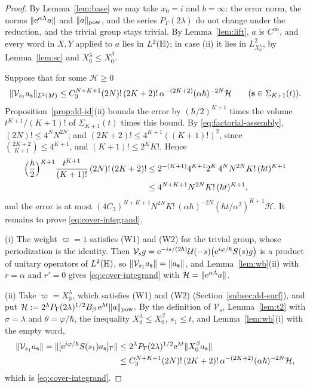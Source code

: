\begin{proof}
By Lemma~\ref{lem:base} we may take $x_0=i$ and $b=\infty$: the error norm, the norms $\lVert \mathrm{e}^{\alpha\Lambda}a\rVert$ and $\lVert a\rVert_{\mathrm{pow}}$, and
the series $P_\Gamma(2\lambda)$ do not change under the reduction, and the trivial group stays trivial. By Lemma~\ref{lem:lift}, $a$ is
$C^\infty$, and every word in $X,Y$ applied to $a$ lies in $L^2(\mathbb{H})$; in case (ii) it lies in $L^2_{X_0^\lambda}$, by
Lemma~\ref{lem:sc} and $X_0^\lambda\le X_0^\beta$.

Suppose that for some $\mathcal H\ge0$
\begin{equation}\label{eq:cover-integrand}
\lVert \mathcal V_{s_1}a_{\mathbf s}\rVert_{L^2(M)}\le C_3^{N+K+1}(2N)!\,(2K+2)!\,\alpha^{-(2K+2)}(\alpha\hbar)^{-2N}\mathcal H\qquad(\mathbf s\in\Sigma_{K+1}(t)).
\end{equation}
Proposition~\ref{prop:dd-id}(ii) bounds the error by $(\hbar/2)^{K+1}$ times the volume $t^{K+1}/(K+1)!$ of $\Sigma_{K+1}(t)$ times this
bound. By \eqref{eq:factorial-assembly}, $(2N)!\le4^NN^{2N}$; and $(2K+2)!\le4^{K+1}((K+1)!)^2$, since $\binom{2K+2}{K+1}\le4^{K+1}$, and
$(K+1)!\le2^KK!$. Hence
\begin{align*}
\Bigl(\frac\hbar2\Bigr)^{K+1}\frac{t^{K+1}}{(K+1)!}\,(2N)!\,(2K+2)!&\le2^{-(K+1)}4^{K+1}2^K\,4^NN^{2N}K!\,(\hbar t)^{K+1}\\
&\le4^{N+K+1}N^{2N}K!\,(\hbar t)^{K+1},
\end{align*}
and the error is at most $(4C_3)^{N+K+1}N^{2N}K!\,(\alpha\hbar)^{-2N}(\hbar t/\alpha^2)^{K+1}\mathcal H$. It remains to prove
\eqref{eq:cover-integrand}.

(i) The weight $\varpi=1$ satisfies \textup{(W1)} and \textup{(W2)} for the trivial group, whose periodization is the identity. Then
$\mathcal V_sg=\mathrm{e}^{-is/(2\hbar)}\mathcal{U}(-s)\bigl(\mathrm{e}^{i\varphi/\hbar}S(s)g\bigr)$ is a product of unitary operators of $L^2(\mathbb{H})$, so
$\lVert \mathcal V_{s_1}a_{\mathbf s}\rVert=\lVert a_{\mathbf s}\rVert$, and Lemma~\ref{lem:wb}(ii) with $r=\alpha$ and $r'=0$ gives
\eqref{eq:cover-integrand} with $\mathcal H=\lVert \mathrm{e}^{\alpha\Lambda}a\rVert$.

(ii) Take $\varpi=X_0^\lambda$, which satisfies \textup{(W1)} and \textup{(W2)} (Section~\ref{subsec:dd-surf}), and put
$\mathcal H:=2^\lambda P_\Gamma(2\lambda)^{1/2}B_\beta\,\mathrm{e}^{\lambda t}\lVert a\rVert_{\mathrm{pow}}$. By the definition of $\mathcal V_s$, Lemma~\ref{lem:t2}
with $\sigma=\lambda$ and $\theta=\varphi/\hbar$, the inequality $X_0^\lambda\le X_0^\beta$, $s_1\le t$, and Lemma~\ref{lem:wb}(i) with the
empty word,
\begin{align*}
\lVert \mathcal V_{s_1}a_{\mathbf s}\rVert=\lVert [\mathrm{e}^{i\varphi/\hbar}S(s_1)a_{\mathbf s}]_\Gamma\rVert
&\le2^\lambda P_\Gamma(2\lambda)^{1/2}\mathrm{e}^{\lambda t}\lVert X_0^\beta a_{\mathbf s}\rVert\\
&\le C_3^{N+K+1}(2N)!\,(2K+2)!\,\alpha^{-(2K+2)}(\alpha\hbar)^{-2N}\mathcal H,
\end{align*}
which is \eqref{eq:cover-integrand}.
\end{proof}

